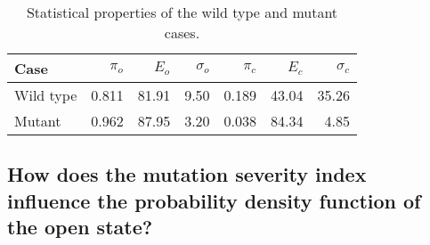 \begin{table}[ptb]
\begin{center}
\begin{tabular}
[c]{|l|r|r|r||r|r|r|}\hline
Case & $\pi_{o}$ & $E_{o}$ & $\sigma_{o}$ & $\pi_{c}$ & $E_{c}$ & $\sigma_{c}
$\\\hline
Wild type & 0.811 & 81.91 & 9.50 & 0.189 & 43.04 & 35.26\\\hline
Mutant & 0.962 & 87.95 & 3.20 & 0.038 & 84.34 & 4.85\\\hline
\end{tabular}
\end{center}
\caption{Statistical properties of the wild type and mutant cases.}
\label{stat1D}
\end{table}



\subsection{How does the mutation severity index influence the probability
density function of the open state?}

